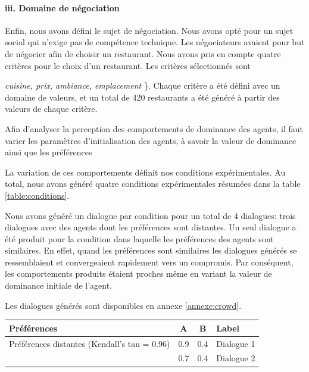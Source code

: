 				\paragraph{iii. Domaine de négociation}
				
				Enfin, nous avons défini le sujet de négociation. Nous avons opté pour un sujet social qui n'exige pas de compétence technique. Les négociateurs avaient pour but de négocier afin de choisir un restaurant. Nous avons pris en compte quatre critères pour le choix d'un restaurant. 	Les critères sélectionnés sont \ {\textit {cuisine, prix, ambiance, emplacement} \}. Chaque critère a été défini avec un domaine de valeurs, et un total de 420 restaurants a été généré à partir des valeurs de chaque critère.
				
				Afin d'analyser la perception des comportements de dominance des agents, il faut varier les paramètres d'initialisation des agents, à savoir la valeur de dominance ainsi que les préférences
				
				La variation de ces comportements définit nos conditions expérimentales. 
				Au total, nous avons généré quatre conditions expérimentales résumées dans la table \ref{table:conditions}. 
				
				Nous avons généré un dialogue par condition pour un total de 4 dialogues: trois dialogues avec des agents dont les préférences sont distantes. Un seul dialogue a été produit pour la condition dans laquelle les préférences des agents sont similaires. En effet, quand les préférences sont similaires les dialogues générés se ressemblaient et convergeaient rapidement vers un compromis. Par conséquent, les comportements produits étaient proches même en variant la valeur de dominance initiale de l'agent.   
				
				Les dialogues générés sont disponibles en annexe \ref{annexe:crowd}.
				
				\begin{table}[h]
					\centering
					\begin{tabular}{ |l|c|c|l| }
						\hline
						\textbf{Préférences}& \textbf{A} & \textbf{B} & \textbf{Label} \\ 
						\hline
						\newline\multirow{3}{*} {Préférences distantes (Kendall's tau = $0.96$)} & 0.9 & 0.4 & Dialogue 1 \\ \cline{2-4}
						
						\newline  & 0.7 & 0.4 & Dialogue 2\\ \cline{2-4}
						

\end{tabular}
\end{table}}
